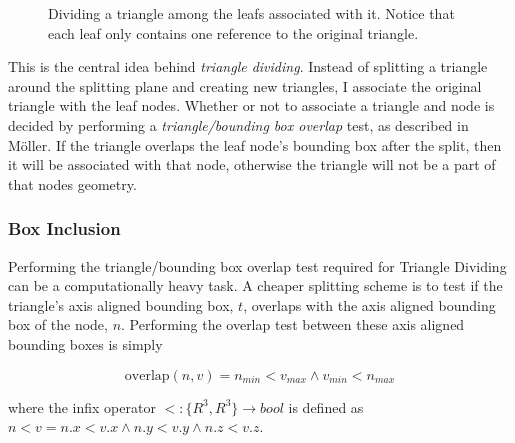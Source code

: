 \begin{figure}
  \centering
  
  \vspace{3mm}
  \parbox{5cm}{\caption[Dividing a triangle.]{Dividing a triangle among the
      leafs associated with it. Notice that each leaf only contains one
      reference to the original triangle.}\label{fig:dividing}}
\end{figure}

This is the central idea behind \textit{triangle dividing}. Instead of splitting
a triangle around the splitting plane and creating new triangles, I associate
the original triangle with the leaf nodes. Whether or not to associate a
triangle and node is decided by performing a \textit{triangle/bounding box
  overlap} test, as described in Möller. If the triangle
overlaps the leaf node's bounding box after the split, then it will be
associated with that node, otherwise the triangle will not be a part of that
nodes geometry.


\subsubsection{Box Inclusion}\label{sec:boxInclusion}


Performing the triangle/bounding box overlap test required for Triangle Dividing
can be a computationally heavy task. A cheaper splitting scheme is to test if
the triangle's axis aligned bounding box, $t$, overlaps with the axis aligned
bounding box of the node, $n$. Performing the overlap test between these axis
aligned bounding boxes is simply

\begin{displaymath}
  \text{overlap}(n,v) = n_{min} < v_{max} \wedge v_{min} < n_{max}
\end{displaymath}

where the infix operator $<: \{R^3, R^3\} \rightarrow bool$ is defined as $n < v
= n.x < v.x \wedge n.y < v.y \wedge n.z < v.z$.

